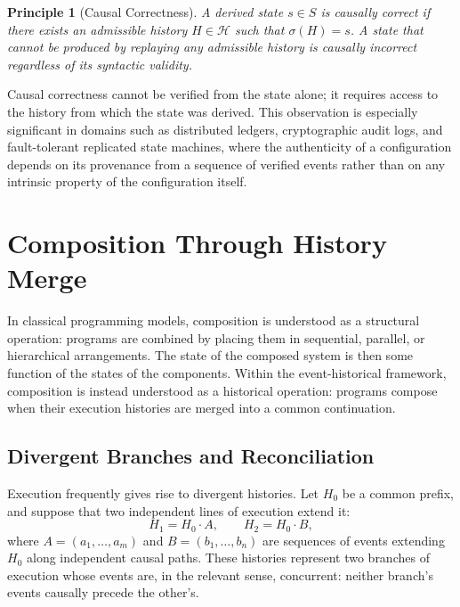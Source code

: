 \documentclass[12pt]{article}
\newtheorem{principle}{Principle}
\begin{document}
\begin{principle}[Causal Correctness]
A derived state $s \in S$ is \emph{causally correct} if there exists an admissible history $H \in \mathcal{H}$ such that $\sigma(H) = s$. A state that cannot be produced by replaying any admissible history is causally incorrect regardless of its syntactic validity.
\end{principle}

Causal correctness cannot be verified from the state alone; it requires access to the history from which the state was derived. This observation is especially significant in domains such as distributed ledgers, cryptographic audit logs, and fault-tolerant replicated state machines, where the authenticity of a configuration depends on its provenance from a sequence of verified events rather than on any intrinsic property of the configuration itself.


\section{Composition Through History Merge}
\label{sec:composition}

In classical programming models, composition is understood as a structural operation: programs are combined by placing them in sequential, parallel, or hierarchical arrangements. The state of the composed system is then some function of the states of the components. Within the event-historical framework, composition is instead understood as a historical operation: programs compose when their execution histories are merged into a common continuation.

\subsection{Divergent Branches and Reconciliation}

Execution frequently gives rise to divergent histories. Let $H_0$ be a common prefix, and suppose that two independent lines of execution extend it:
\[
H_1 = H_0 \cdot A, \qquad H_2 = H_0 \cdot B,
\]
where $A = (a_1, \ldots, a_m)$ and $B = (b_1, \ldots, b_n)$ are sequences of events extending $H_0$ along independent causal paths. These histories represent two branches of execution whose events are, in the relevant sense, concurrent: neither branch's events causally precede the other's.
\end{document}
